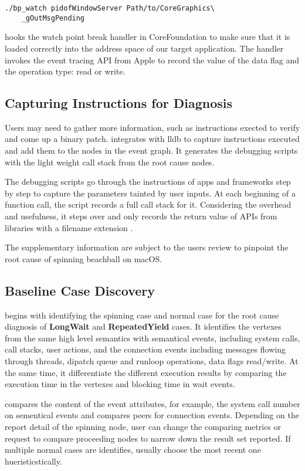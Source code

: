 \begin{lstlisting}
./bp_watch pidofWindowServer Path/to/CoreGraphics\
	_gOutMsgPending
\end{lstlisting}

\xxx hooks the watch point break handler in CoreFoundation to make sure that it is
loaded correctly into the address space of our target application. The handler
invokes the event tracing API from Apple to record the value of the data flag
and the operation type: read or write.

\subsection{Capturing Instructions for Diagnosis}

Users may need to gather more information, such as instructions exected to
verify and come up a binary patch. \xxx integrates with lldb to capture
instructions executed and add them to the nodes in the event graph. It generates
the debugging scripts with the light weight call stack from the root cause
nodes.

The debugging scripts go through the instructions of apps and frameworks step
by step to capture the parameters tainted by user inputs. At each beginning of
a function call, the script records a full call stack for it. Considering the
overhead and usefulness, it steps over and only records the return value of APIs
from libraries with a filename extension \vv{.dylib}.

The supplementary information are subject to the users review to pinpoint the
root cause of spinning beachball on macOS.

\subsection{Baseline Case Discovery }

\xxx begins with identifying the spinning case and normal case for the root
cause diagnosis of \textbf{LongWait} and \textbf{RepeatedYield} cases. It
identifies the vertexes from the same high level semantics with semantical
events, including system calls, call stacks, user actions, and the connection
events including messages flowing through threads, dipatch queue and runloop
operations, data flags read/write. At the same time, it differentiate the
different execution results by comparing the execution time in the vertexes and
blocking time in wait events.

\xxx compares the content of the event attributes, for example, the system call
number on sementical events and compares peers for connection events. Depending
on the report detail of the spinning node, user can change the comparing metrics
or request \xxx to compare proceeding nodes to narrow down the result set
reported. If multiple normal cases are identifies, \xxx usually choose the most
recent one hueristicstically.

